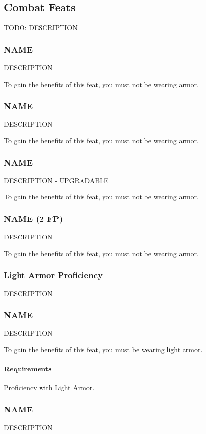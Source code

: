 \subsection*{Combat Feats}
TODO: DESCRIPTION

\subsubsection{NAME} \label{feat::name}
    DESCRIPTION

    To gain the benefits of this feat, you must not be wearing armor.
\subsubsection{NAME} \label{feat::name}
    DESCRIPTION

    To gain the benefits of this feat, you must not be wearing armor.
\subsubsection{NAME} \label{feat::name}
    DESCRIPTION - UPGRADABLE

    To gain the benefits of this feat, you must not be wearing armor.
\subsubsection{NAME (2 FP)} \label{feat::name}
    DESCRIPTION

    To gain the benefits of this feat, you must not be wearing armor.
\subsubsection{Light Armor Proficiency} \label{feat::name}
    DESCRIPTION
\subsubsection{NAME} \label{feat::name}
    DESCRIPTION

    To gain the benefits of this feat, you must be wearing light armor.
    \paragraph{Requirements} Proficiency with Light Armor.
\subsubsection{NAME} \label{feat::name}
    DESCRIPTION

